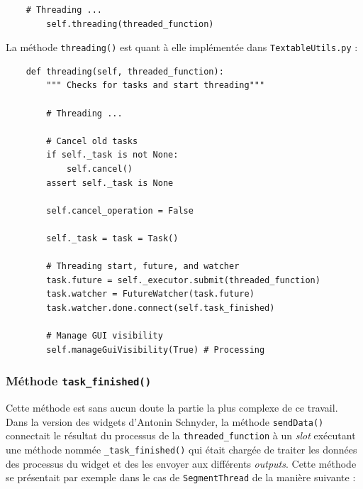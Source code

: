 \documentclass{article}
\begin{document}
\begin{verbatim}
    # Threading ...
        self.threading(threaded_function)
\end{verbatim}

La méthode \texttt{threading()} est quant à elle implémentée dans \texttt{TextableUtils.py} : 

\begin{verbatim}
    def threading(self, threaded_function):
        """ Checks for tasks and start threading"""

        # Threading ...

        # Cancel old tasks
        if self._task is not None:
            self.cancel()
        assert self._task is None

        self.cancel_operation = False

        self._task = task = Task()
        
        # Threading start, future, and watcher
        task.future = self._executor.submit(threaded_function)
        task.watcher = FutureWatcher(task.future)
        task.watcher.done.connect(self.task_finished)
        
        # Manage GUI visibility
        self.manageGuiVisibility(True) # Processing
\end{verbatim}

\subsubsection{Méthode \texttt{task\_finished()}}

Cette méthode est sans aucun doute la partie la plus complexe de ce travail. Dans la version des widgets d'Antonin Schnyder, la méthode \texttt{sendData()} connectait le résultat du processus de la \texttt{threaded\_function} à un \textit{slot} exécutant une méthode nommée \texttt{\_task\_finished()} qui était chargée de traiter les données des processus du widget et des les envoyer aux différents \textit{outputs}. Cette méthode se présentait par exemple dans le cas de \texttt{SegmentThread} de la manière suivante : 
\end{document}
